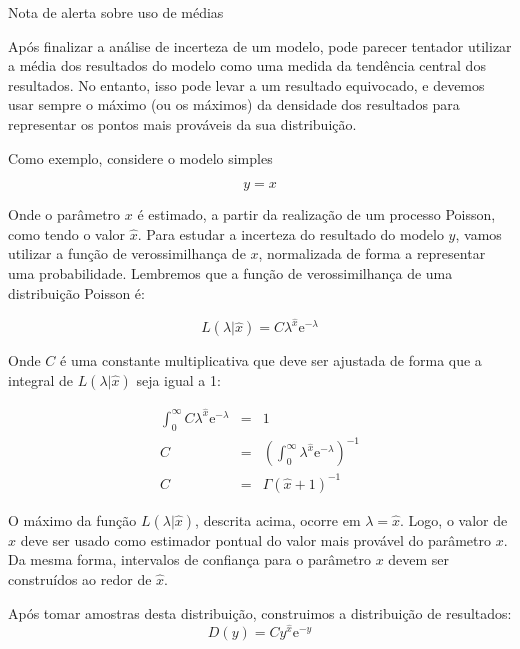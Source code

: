 \documentclass[12pt,a4paper]{article}
\begin{document}
\begin{center}
	{\Large Nota de alerta sobre uso de m\'edias}
\end{center}

Ap\'os finalizar a an\'alise de incerteza de um modelo, pode parecer
tentador utilizar a m\'edia dos resultados do modelo como uma medida
da tend\^encia central dos resultados. No entanto, isso pode levar
a um resultado equivocado, e devemos usar sempre o m\'aximo
(ou os m\'aximos) da densidade dos resultados para representar os
pontos mais prov\'aveis da sua distribui\c c\~ao.

Como exemplo, considere o modelo simples

\begin{equation}
	y = x
\end{equation}

Onde o par\^ametro $x$ \'e estimado, a partir da realiza\c c\~ao de um
processo Poisson, como tendo o valor $\hat x$. Para estudar a incerteza
do resultado do modelo $y$, vamos utilizar a fun\c c\~ao de verossimilhan\c ca
de $x$, normalizada de forma a representar uma probabilidade. Lembremos que
a fun\c c\~ao de verossimilhan\c ca de uma distribui\c c\~ao Poisson
\'e:

\begin{equation}
	L \left( \lambda | \hat x \right) = C \lambda^{\hat x} \mathrm{e}^{-\lambda}
\end{equation}

Onde $C$ \'e uma constante multiplicativa que deve ser ajustada de forma
que a integral de $L(\lambda | \hat x)$ seja igual a 1:

\begin {eqnarray*}
\int_0^\infty C \lambda^{\hat x} \mathrm{e}^{-\lambda} & = & 1 \\
C & = & \left( \int_0^\infty  \lambda^{\hat x} \mathrm{e}^{-\lambda} \right)^{-1} \\
C & = & \Gamma(\hat x +1)^{-1}
\end{eqnarray*}

O m\'aximo da fun\c c\~ao $L(\lambda | \hat x)$, descrita acima, ocorre em $\lambda = \hat x$.
Logo, o valor de $\hat x$ deve ser usado como estimador pontual do valor mais prov\'avel
do par\^ametro $x$. Da mesma forma, intervalos de confian\c ca para o par\^ametro $x$ devem
ser constru\'idos ao redor de $\hat x$.

Ap\'os tomar amostras desta distribui\c c\~ao, construimos a distribui\c c\~ao
de resultados:
\begin{equation}
	D(y) = C y^{\hat x} \mathrm{e}^{-y}
\end{equation}
\end{document}
